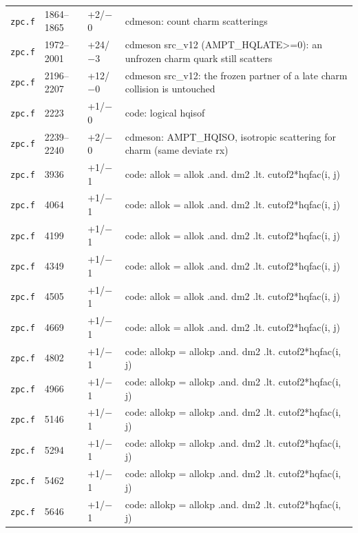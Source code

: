 {\begin{longtable}{@{}p{2.7cm}p{1.5cm}p{1.3cm}p{9.4cm}@{}}
\texttt{zpc.f} & 1864--1865 & +2/$-$0 & cdmeson: count charm scatterings \\
\texttt{zpc.f} & 1972--2001 & +24/$-$3 & cdmeson src\_\allowbreak{}v12 (AMPT\_\allowbreak{}HQLATE>=0): an unfrozen charm quark still scatters \\
\texttt{zpc.f} & 2196--2207 & +12/$-$0 & cdmeson src\_\allowbreak{}v12: the frozen partner of a late charm collision is untouched \\
\texttt{zpc.f} & 2223 & +1/$-$0 & code: logical hqisof \\
\texttt{zpc.f} & 2239--2240 & +2/$-$0 & cdmeson: AMPT\_\allowbreak{}HQISO, isotropic scattering for charm (same deviate rx) \\
\texttt{zpc.f} & 3936 & +1/$-$1 & code: allok = allok .and. dm2 .lt. cutof2*hqfac(i, j) \\
\texttt{zpc.f} & 4064 & +1/$-$1 & code: allok = allok .and. dm2 .lt. cutof2*hqfac(i, j) \\
\texttt{zpc.f} & 4199 & +1/$-$1 & code: allok = allok .and. dm2 .lt. cutof2*hqfac(i, j) \\
\texttt{zpc.f} & 4349 & +1/$-$1 & code: allok = allok .and. dm2 .lt. cutof2*hqfac(i, j) \\
\texttt{zpc.f} & 4505 & +1/$-$1 & code: allok = allok .and. dm2 .lt. cutof2*hqfac(i, j) \\
\texttt{zpc.f} & 4669 & +1/$-$1 & code: allok = allok .and. dm2 .lt. cutof2*hqfac(i, j) \\
\texttt{zpc.f} & 4802 & +1/$-$1 & code: allokp = allokp .and. dm2 .lt. cutof2*hqfac(i, j) \\
\texttt{zpc.f} & 4966 & +1/$-$1 & code: allokp = allokp .and. dm2 .lt. cutof2*hqfac(i, j) \\
\texttt{zpc.f} & 5146 & +1/$-$1 & code: allokp = allokp .and. dm2 .lt. cutof2*hqfac(i, j) \\
\texttt{zpc.f} & 5294 & +1/$-$1 & code: allokp = allokp .and. dm2 .lt. cutof2*hqfac(i, j) \\
\texttt{zpc.f} & 5462 & +1/$-$1 & code: allokp = allokp .and. dm2 .lt. cutof2*hqfac(i, j) \\
\texttt{zpc.f} & 5646 & +1/$-$1 & code: allokp = allokp .and. dm2 .lt. cutof2*hqfac(i, j) \\
\bottomrule \end{longtable}}

